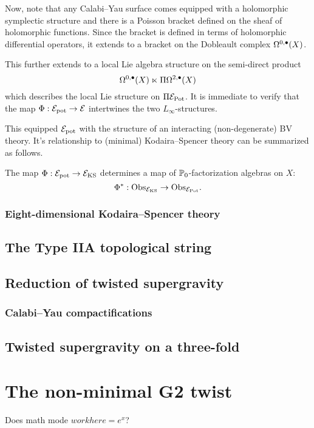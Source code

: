 \documentclass[11pt]{amsart}
\begin{document}
Now, note that any Calabi--Yau surface comes equipped with a holomorphic symplectic structure and there is a Poisson bracket defined on the sheaf of holomorphic functions.
Since the bracket is defined in terms of holomorphic differential operators, it extends to a bracket on the Dobleault complex $\Omega^{0,\bullet}(X)$.

This further extends to a local Lie algebra structure on the semi-direct product
\[
\Omega^{0,\bullet}(X) \ltimes \Pi \Omega^{2,\bullet}(X)
\]
which describes the local Lie structure on $\Pi \mathcal E_{\rm Pot}$.
It is immediate to verify that the map $\Phi : \mathcal E_{\rm pot} \to \mathcal E$ intertwines the two $L_\infty$-structures.

This equipped $\mathcal E_{\rm pot}$ with the structure of an interacting (non-degenerate) BV theory.
It's relationship to (minimal) Kodaira--Spencer theory can be summarized as follows.

\begin{prop}
The map $\Phi : \mathcal E_{\rm pot} \to \mathcal E_{\rm KS}$ determines a map of $\mathbb P_0$-factorization algebras on $X$:
\[
\Phi^* : {\rm Obs}_{\mathcal E_{\rm KS}} \to {\rm Obs}_{\mathcal E_{\rm Pot}} .
\]
\end{prop}

\subsubsection{Eight-dimensional Kodaira--Spencer theory}
\label{sec:orgeb2dd4d}
\subsection{The Type IIA topological string}
\label{IIAtop}
\subsection{Reduction of twisted supergravity}
\label{sec:orgcf7b6a4}
\subsubsection{Calabi--Yau compactifications}
\label{sec:org16a2c98}
\subsection{Twisted supergravity on a three-fold}
\label{sec:org774abb4}
\section{The non-minimal G2 twist}
\label{sec:org590ab85}
Does math mode \(work here = e^x\)?
\end{document}
